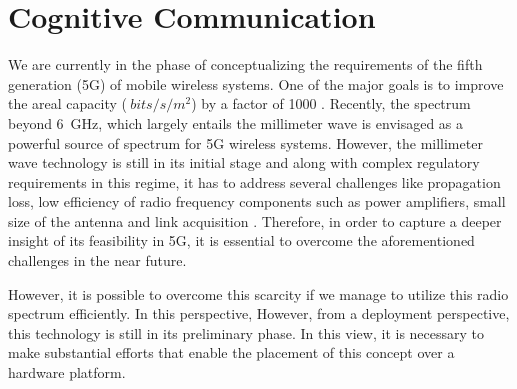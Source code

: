 \chapter{Cognitive Communication}
\label{chap:wav}

We are currently in the phase of conceptualizing the requirements of the fifth generation (5G) of mobile wireless systems. One of the major goals is to improve the areal capacity ($\SI{}{bits/s/m^2}$) by a factor of 1000 \cite{Andrews14}.  
Recently, the spectrum beyond \SI{6}{GHz}, which largely entails the millimeter wave is envisaged as a powerful source of spectrum for 5G wireless systems. However, the millimeter wave technology is still in its initial stage and along with complex regulatory requirements in this regime, it has to address several challenges like propagation loss, low efficiency of radio frequency components such as power amplifiers, small size of the antenna and link acquisition \cite{Rapp13}. Therefore, in order to capture a deeper insight of its feasibility in 5G, it is essential to overcome the aforementioned challenges in the near future.

 However, it is possible to overcome this scarcity if we manage to utilize this radio spectrum efficiently. In this perspective,  However, from a deployment perspective, this technology is still in its preliminary phase. In this view, it is necessary to make substantial efforts that enable the placement of this concept over a hardware platform.

